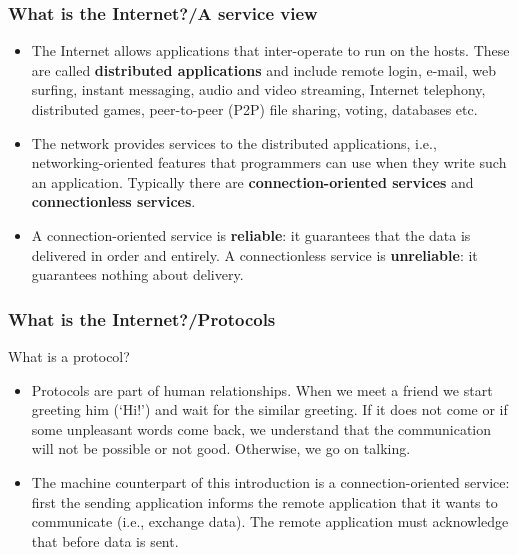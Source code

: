 %
\begin{frame}
\frametitle{What is the Internet?/A service view}

\begin{itemize}

  \item The Internet allows applications that inter-operate to run on
  the hosts. These are called \textbf{distributed applications} and
  include remote login, e-mail, web surfing, instant messaging, audio
  and video streaming, Internet telephony, distributed games,
  peer-to-peer (P2P) file sharing, voting, databases etc.

  \item The network provides services to the distributed
  applications, i.e., networking\hyp{}oriented features that
  programmers can use when they write such an application. Typically
  there are \textbf{connection-oriented services} and
  \textbf{connectionless services}.

  \item A connection-oriented service is \textbf{reliable}: it
  guarantees that the data is delivered in order and entirely. A
  connectionless service is \textbf{unreliable}: it guarantees
  nothing about delivery.

\end{itemize}

\end{frame}

%
\begin{frame}
\frametitle{What is the Internet?/Protocols}

What is a protocol?

\begin{itemize}

  \item Protocols are part of human relationships. When we meet a
  friend we start greeting him (`Hi!') and wait for the similar
  greeting. If it does not come or if some unpleasant words come back,
  we understand that the communication will not be possible or
  not good. Otherwise, we go on talking.

  \item The machine counterpart of this introduction is a
  connection-oriented service: first the sending application informs
  the remote application that it wants to communicate (i.e., exchange
  data). The remote application must acknowledge that before data is
  sent.

\end{itemize}

\end{frame}

